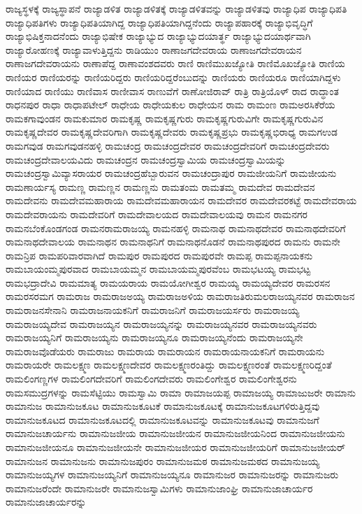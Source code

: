 {ರಾಜ್ಯಸ್ಥಳಕ್ಕೆ
ರಾಜ್ಯಸ್ಥಾಪನೆ
ರಾಜ್ಯಾಡಳಿತ
ರಾಜ್ಯಾಡಳಿತಕ್ಕೆ
ರಾಜ್ಯಾಡಳಿತವನ್ನು
ರಾಜ್ಯಾಡಳಿತವು
ರಾಜ್ಯಾಧಿಪ
ರಾಜ್ಯಾಧಿಪತಿ
ರಾಜ್ಯಾಧಿಪತಿಗಳು
ರಾಜ್ಯಾಧಿಪತಿಯಾಗಿದ್ದ
ರಾಜ್ಯಾಧಿಪತಿಯಾಗಿದ್ದನೆಂದು
ರಾಜ್ಯಾಪಹಾರಕ್ಕೆ
ರಾಜ್ಯಾಭಿವೃದ್ಧಿಗೆ
ರಾಜ್ಯಾಭಿಷಿಕ್ತನಾದನೆಂದು
ರಾಜ್ಯಾಭಿಷೇಕ
ರಾಜ್ಯಾಭ್ಯುದ
ರಾಜ್ಯಾಭ್ಯುದಯಾರ್ತ್ಥ
ರಾಜ್ಯಾಭ್ಯುದಯಾರ್ಥವಾಗಿ
ರಾಜ್ಯಾರೋಹಣಕ್ಕೆ
ರಾಜ್ಯಾವಾಳುತ್ತಿದ್ದನು
ರಾಡಿಯುಂ
ರಾಣಾಜಗದೇವರಾಯ
ರಾಣಾಜಗದೇವರಾಯನ
ರಾಣಾಜಗದೇವರಾಯನು
ರಾಣಾಪೆದ್ದ
ರಾಣಾವಂಶದವರು
ರಾಣಿ
ರಾಣಿಮುಖಜ್ಯೋತಿ
ರಾಣಿಮೊಖಜ್ಯೋತಿ
ರಾಣಿಯ
ರಾಣಿಯರ
ರಾಣಿಯರನ್ನು
ರಾಣಿಯರಿದ್ದರು
ರಾಣಿಯರಿದ್ದರೆಂಬುದನ್ನು
ರಾಣಿಯರು
ರಾಣಿಯರೂ
ರಾಣಿಯಾಗಿದ್ದಳು
ರಾಣಿಯಾದ
ರಾಣಿಯು
ರಾಣಿವಾಸ
ರಾಣೀವಾಸ
ರಾಣುವೆಗೆ
ರಾಣೋಜಿರಾವ್
ರಾತ್ರಿ
ರಾತ್ರಿಯೊಳ್
ರಾದ
ರಾದ್ಧಾಂತ
ರಾಧನಪುರ
ರಾಧಾ
ರಾಧಾಪಟೇಲ್
ರಾಧೇಯ
ರಾಧೇಯಕುಲ
ರಾಧೇಯನ
ರಾಮ
ರಾಮಂಣ
ರಾಮಅರಸಿಕೆರೆಯ
ರಾಮಕಗಾವುಂಡನ
ರಾಮಕುಮಾರ
ರಾಮಕೃಷ್ಣ
ರಾಮಕೃಷ್ಣಗುರು
ರಾಮಕೃಷ್ಣಗುರುವಿಗೇ
ರಾಮಕೃಷ್ಣಗುರುವಿನ
ರಾಮಕೃಷ್ಣದೇವರ
ರಾಮಕೃಷ್ಣದೇವರಿಗಾಗಿ
ರಾಮಕೃಷ್ಣದೇವರು
ರಾಮಕೃಷ್ಣಪ್ರಭು
ರಾಮಕೃಷ್ಣಭಿರಾಧ್ಯ
ರಾಮಗಉಡ
ರಾಮಗವುಡ
ರಾಮಗವುಡನಹಳ್ಳಿ
ರಾಮಚಂದ್ರ
ರಾಮಚಂದ್ರದೇವರ
ರಾಮಚಂದ್ರದೇವರಿಗೆ
ರಾಮಚಂದ್ರದೇವರು
ರಾಮಚಂದ್ರದೇವಾಲಯವಿದು
ರಾಮಚಂದ್ರನ
ರಾಮಚಂದ್ರಸ್ವಾಮಿಯ
ರಾಮಚಂದ್ರಸ್ವಾಮಿಯನ್ನು
ರಾಮಚಂದ್ರಸ್ವಾಮಿವ್ಯಾಸರಾಯರ
ರಾಮಚಂದ್ರಹೆಬ್ಬಾರುವನ
ರಾಮಚಂದ್ರಾಪುರ
ರಾಮಜೀಯನಿಗೆ
ರಾಮಜೀಯನು
ರಾಮಣಾರ್ಯಸ್ಯ
ರಾಮಣ್ಣ
ರಾಮಣ್ಣನ
ರಾಮಣ್ಣನು
ರಾಮತಂಮ
ರಾಮತಮ್ಮ
ರಾಮದೇವ
ರಾಮದೇವನ
ರಾಮದೇವನು
ರಾಮದೇವಮಹಾರಾಯ
ರಾಮದೇವಮಹಾರಾಯನ
ರಾಮದೇವರ
ರಾಮದೇವರಕಟ್ಟೆ
ರಾಮದೇವರಾಯ
ರಾಮದೇವರಾಯನು
ರಾಮದೇವರಿಗೆ
ರಾಮದೇವಾಲಯದ
ರಾಮದೇವಾಲಯವು
ರಾಮನ
ರಾಮನಗರ
ರಾಮನಬೆಂಕೊಂಡಗಂಡ
ರಾಮನರಾಮರಾಜಯ್ಯ
ರಾಮನಹಳ್ಳಿ
ರಾಮನಾಥ
ರಾಮನಾಥದೇವರ
ರಾಮನಾಥದೇವರಿಗೆ
ರಾಮನಾಥದೇವಾಲಯ
ರಾಮನಾಥನ
ರಾಮನಾಥನಿಗೆ
ರಾಮನಾಥನೊಡನೆ
ರಾಮನಾಥಪುರದ
ರಾಮನು
ರಾಮನೇ
ರಾಮನ್ರಿಪ
ರಾಮಪರಿವಾರವಾಗಿದೆ
ರಾಮಪುರ
ರಾಮಪುರದ
ರಾಮಪುರವೇ
ರಾಮಪ್ಪ
ರಾಮಪ್ಪನಾಯಕನು
ರಾಮಬಾಯಂಮ್ಮಪುರವಾದ
ರಾಮಬಾಯಮ್ಮನ
ರಾಮಬಾಯಮ್ಮಪುರವೆಂಬ
ರಾಮಭಟಯ್ಯ
ರಾಮಭಟ್ಟ
ರಾಮಭದ್ರಾದೇವಿ
ರಾಮಮಾತ್ಯ
ರಾಮಯರಾಯ
ರಾಮಯೋಗೀಶ್ವರ
ರಾಮಯ್ಯ
ರಾಮಯ್ಯದೇವರ
ರಾಮರಸನ
ರಾಮರಸರಮಗ
ರಾಮರಾಜ
ರಾಮರಾಜಅಯ್ಯ
ರಾಮರಾಜಅಳಿಯ
ರಾಮರಾಜತಿರುಮಲರಾಜಯ್ಯನವರ
ರಾಮರಾಜನ
ರಾಮರಾಜನಸೇನಾನಿ
ರಾಮರಾಜನಾಯಕನಿಗೆ
ರಾಮರಾಜನಿಗೆ
ರಾಮರಾಜಯರ್ಸರು
ರಾಮರಾಜಯ್ಯ
ರಾಮರಾಜಯ್ಯದೇವ
ರಾಮರಾಜಯ್ಯನ
ರಾಮರಾಜಯ್ಯನನ್ನು
ರಾಮರಾಜಯ್ಯನವರ
ರಾಮರಾಜಯ್ಯನವರು
ರಾಮರಾಜಯ್ಯನಿಗೆ
ರಾಮರಾಜಯ್ಯನು
ರಾಮರಾಜಯ್ಯನೂ
ರಾಮರಾಜಯ್ಯನೆಂದು
ರಾಮರಾಜಯ್ಯನೇ
ರಾಮರಾಜವೊಡೆಯರು
ರಾಮರಾಜು
ರಾಮರಾಯ
ರಾಮರಾಯನ
ರಾಮರಾಯನಾಯಕನಿಗೆ
ರಾಮರಾಯನು
ರಾಮರಾಯರೇ
ರಾಮಲಕ್ಷ್ಮಣ
ರಾಮಲಕ್ಷ್ಮಣದೇವರ
ರಾಮಲಕ್ಷ್ಮಣರಂತಿದ್ದು
ರಾಮಲಕ್ಷ್ಮಣರಂತೆ
ರಾಮಲಕ್ಷ್ಮಣರಿದ್ದಂತೆ
ರಾಮಲಿಂಗಣ್ಣಗಳ
ರಾಮಲಿಂಗದೇವರಿಗೆ
ರಾಮಲಿಂಗದೇವರು
ರಾಮಲಿಂಗೇಶ್ವರ
ರಾಮಲಿಂಗೇಶ್ವರನು
ರಾಮಸಮುದ್ರಗಳನ್ನು
ರಾಮಸೆಟ್ಟಿಯು
ರಾಮಸ್ವಾಮಿ
ರಾಮಾ
ರಾಮಾಜಯಪ್ಪ
ರಾಮಾಜಯ್ಯ
ರಾಮಾಜುಜರೇ
ರಾಮಾನು
ರಾಮಾನುಜ
ರಾಮಾನುಜಕೂಟ
ರಾಮಾನುಜಕೂಟಕೆ
ರಾಮಾನುಜಕೂಟಕ್ಕೆ
ರಾಮಾನುಜಕೂಟಗಳಿರುತ್ತಿದ್ದವು
ರಾಮಾನುಜಕೂಟದ
ರಾಮಾನುಜಕೂಟದಲ್ಲಿ
ರಾಮಾನುಜಕೂಟವನ್ನು
ರಾಮಾನುಜಕೂಟವು
ರಾಮಾನುಜಗೆ
ರಾಮಾನುಜಚಾರ್ಯನು
ರಾಮಾನುಜಜೀಯ
ರಾಮಾನುಜಜೀಯನ
ರಾಮಾನುಜಜೀಯನಿಂದ
ರಾಮಾನುಜಜೀಯನು
ರಾಮಾನುಜಜೀಯನೂ
ರಾಮಾನುಜಜೀಯನೇ
ರಾಮಾನುಜಜೀಯರ
ರಾಮಾನುಜಜೀಯರಿಗೆ
ರಾಮಾನುಜಜೀಯರ್
ರಾಮಾನುಜನ
ರಾಮಾನುಜನು
ರಾಮಾನುಜಪುರಂ
ರಾಮಾನುಜಮಠ
ರಾಮಾನುಜಮಠದ
ರಾಮಾನುಜಯ್ಯ
ರಾಮಾನುಜಯ್ಯಗಳ
ರಾಮಾನುಜಯ್ಯನಿಗೆ
ರಾಮಾನುಜಯ್ಯನೂ
ರಾಮಾನುಜರ
ರಾಮಾನುಜರನ್ನು
ರಾಮಾನುಜರು
ರಾಮಾನುಜರೆಂದೇ
ರಾಮಾನುಜರೇ
ರಾಮಾನುಜಸ್ವಾಮಿಗಳು
ರಾಮಾನುಜಾಂಘ್ರಿ
ರಾಮಾನುಜಾಚಾರ್ಯರ
ರಾಮಾನುಜಾಚಾರ್ಯರನ್ನು
}

